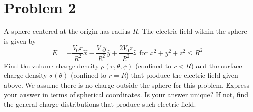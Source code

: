 \documentclass[10pt]{article}
\begin{document}
	\pagebreak 
	\section*{Problem 2}
	A sphere centered at the origin has radius $R$. The electric field within the sphere is given by
	\[
	E = -\frac{V_0x}{R^2}\hat{x} - \frac{V_0y}{R^2}\hat{y} + \frac{2V_0z}{R^2}\hat{z}\ \ \text{for $x^2 + y^2
	+z^2 \le R^2$}
	\] 
	Find the volume charge density $\rho(r, \theta, \phi)$ (confined to $r < R$) and the surface charge density
	$\sigma(\theta)$ (confined to $r = R$) that produce the electric field given above. We assume there is no 
	charge outside the sphere for this problem. Express your answer in terms of spherical coordinates. Is
	your answer unique? If not, find the general charge distributions that produce such electric field. 
\end{document}
